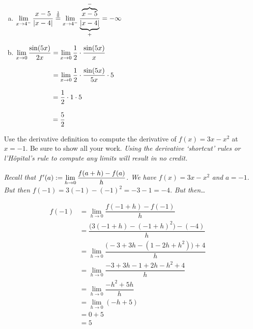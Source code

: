 \documentclass[12pt,letterpaper]{exam}
\begin{document}
\begin{questions}
\begin{enumerate}[(a)]
	\newpage
	
	
	\item $\displaystyle\lim_{x \to 4^-} \dfrac{x - 5}{|x - 4|} \stackrel{\frac{1}{0}}{=} \lim_{x \to 4^-} \dfrac{\overbrace{x - 5}^{-}}{\underbrace{|x - 4|}_{+}}= -\infty$ \vspace{9.25cm}
	
	\item $\displaystyle\lim_{x \to 0} \dfrac{\sin(5 x)}{2x}= \lim_{x \to 0} \dfrac{1}{2} \cdot \dfrac{\sin(5x)}{x}$ \par\vspace{0.3cm} 
	$\ds\phantom{\lim_{x \to 0} \dfrac{\sin(5 x)}{2x}}= \lim_{x \to 0} \dfrac{1}{2} \cdot \dfrac{\sin(5x)}{5x} \cdot 5$ \par\vspace{0.3cm}
	$\ds\phantom{\lim_{x \to 0} \dfrac{\sin(5 x)}{2x}}= \dfrac{1}{2} \cdot 1 \cdot 5$ \par\vspace{0.3cm}
	$\ds\phantom{\lim_{x \to 0} \dfrac{\sin(5 x)}{2x}}= \dfrac{5}{2}$ \vfill
	\end{enumerate}



\newpage
\question[20] Use the derivative definition to compute the derivative of $f(x)= 3x - x^2$ at $x= -1$. Be sure to show all your work. {\itshape Using the derivative `shortcut' rules or l'H\^opital's rule to compute any limits will result in no credit.} \pspace

{\itshape \tsol Recall that $f'(a):= \displaystyle \lim_{h \to 0} \dfrac{f(a + h) - f(a)}{h}$. We have $f(x)= 3x - x^2$ and $a= -1$. But then $f(-1)= 3(-1) - (-1)^2= -3 - 1= -4$. But then\dots \par\vspace{0.5cm}
	\[
	\begin{aligned}
	f(-1)&= \lim_{h \to 0} \dfrac{f(-1 + h) - f(-1)}{h} \\[0.3cm]
	&= \dfrac{\big( 3(-1 + h) - (-1 + h)^2 \big) - (-4)}{h} \\[0.3cm]
	&= \lim_{h \to 0} \dfrac{\big( -3 + 3h - (1 - 2h + h^2) \big) + 4}{h} \\[0.3cm]
	&= \lim_{h \to 0} \dfrac{-3 + 3h -1 + 2h - h^2 + 4}{h} \\[0.3cm]
	&= \lim_{h \to 0} \dfrac{-h^2 + 5h}{h} \\[0.3cm]
	&= \lim_{h \to 0} (-h + 5) \\[0.3cm]
	&= 0 + 5 \\[0.3cm]
	&= 5
	\end{aligned}
	\]
}




\end{questions}
\end{document}
